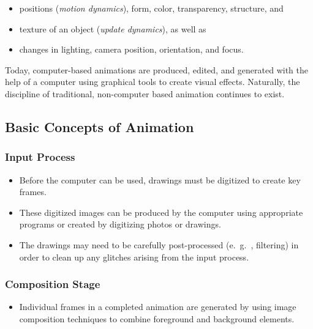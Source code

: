 \begin{itemize}
	\item positions (\textit{motion dynamics}), form, color, transparency, structure, and 
	\item texture of an object (\textit{update dynamics}), as well as 
	\item changes in lighting, camera position, orientation, and focus.
\end{itemize}




Today, computer-based animations are produced, edited, and generated with the help of a computer using graphical tools to create visual effects. Naturally, the discipline of traditional, non-computer based animation continues to exist.

\subsection{Basic Concepts of Animation}

\subsubsection{Input Process}
\begin{itemize}
	\item Before the computer can be used, drawings must be digitized to create key frames.
	\item These digitized images can be produced by the computer using appropriate programs or created by digitizing photos or drawings. 
	\item The drawings may need to be carefully post-processed (e.\ g.\ , filtering) in order to clean up any glitches arising from	the input process.
\end{itemize}


\subsubsection{Composition Stage}
\begin{itemize}
	\item Individual frames in a completed animation are generated by using image composition techniques to combine foreground and background elements. 
\end{itemize}


